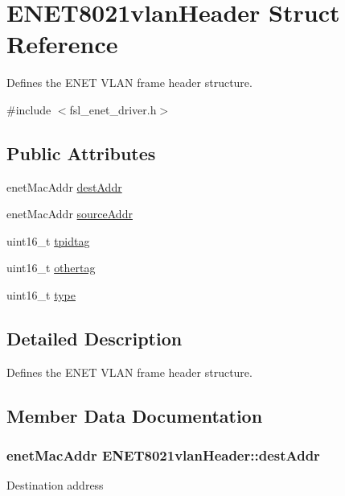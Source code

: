 \hypertarget{structENET8021vlanHeader}{}\section{E\+N\+E\+T8021vlan\+Header Struct Reference}
\label{structENET8021vlanHeader}


Defines the E\+N\+ET V\+L\+AN frame header structure.  




{\ttfamily \#include $<$fsl\+\_\+enet\+\_\+driver.\+h$>$}

\subsection*{Public Attributes}
\begin{DoxyCompactItemize}
\item 
enet\+Mac\+Addr \hyperlink{structENET8021vlanHeader_a4a9d45fed9fd3eb4d9eb73d0273fafb3}{dest\+Addr}
\item 
enet\+Mac\+Addr \hyperlink{structENET8021vlanHeader_a2b86de665d4a8c3f515048008752fe20}{source\+Addr}
\item 
uint16\+\_\+t \hyperlink{structENET8021vlanHeader_a46f7cbd3ac6c7ad498fa463368f4298d}{tpidtag}
\item 
uint16\+\_\+t \hyperlink{structENET8021vlanHeader_ac9f292148776ba1c490d6d37ce1c9fea}{othertag}
\item 
uint16\+\_\+t \hyperlink{structENET8021vlanHeader_a195bc7eacd87c3449ca0267513071c22}{type}
\end{DoxyCompactItemize}


\subsection{Detailed Description}
Defines the E\+N\+ET V\+L\+AN frame header structure. 

\subsection{Member Data Documentation}
\subsubsection[{\texorpdfstring{dest\+Addr}{destAddr}}]{\setlength{\rightskip}{0pt plus 5cm}enet\+Mac\+Addr E\+N\+E\+T8021vlan\+Header\+::dest\+Addr}\hypertarget{structENET8021vlanHeader_a4a9d45fed9fd3eb4d9eb73d0273fafb3}{}\label{structENET8021vlanHeader_a4a9d45fed9fd3eb4d9eb73d0273fafb3}
Destination address 
